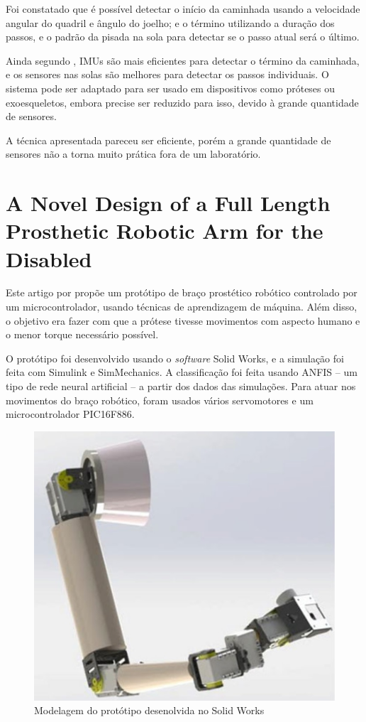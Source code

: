 Foi constatado que é possível detectar o início da caminhada usando a velocidade angular do quadril e ângulo do joelho; e o término utilizando a duração dos passos, e o padrão da pisada na sola para detectar se o passo atual será o último.

Ainda segundo , IMUs são mais eficientes para detectar o término da caminhada, e os sensores nas solas são melhores para detectar os passos individuais. O sistema pode ser adaptado para ser usado em dispositivos como próteses ou exoesqueletos, embora precise ser reduzido para isso, devido à grande quantidade de sensores.

A técnica apresentada pareceu ser eficiente, porém a grande quantidade de sensores não a torna muito prática fora de um laboratório.

\section{A Novel Design of a Full Length Prosthetic Robotic Arm for the Disabled}
\label{sec:rel_kumar}
Este artigo por  propõe um protótipo de braço prostético robótico controlado por um microcontrolador, usando técnicas de aprendizagem de máquina. Além disso, o objetivo era fazer com que a prótese tivesse movimentos com aspecto humano e o menor torque necessário possível.

O protótipo foi desenvolvido usando o \textit{software} Solid Works, e a simulação foi feita com Simulink e SimMechanics. A classificação foi feita usando ANFIS -- um tipo de rede neural artificial -- a partir dos dados das simulações. Para atuar nos movimentos do braço robótico, foram usados vários servomotores e um microcontrolador PIC16F886.

\begin{figure}[h]
	\caption{\label{fig:rel_kumar_1}Modelagem do protótipo desenolvida no Solid Works}
	\begin{center}
	    \includegraphics[width=.5\textwidth]{resources/rel_kumar_1}
	\end{center}
\end{figure}


